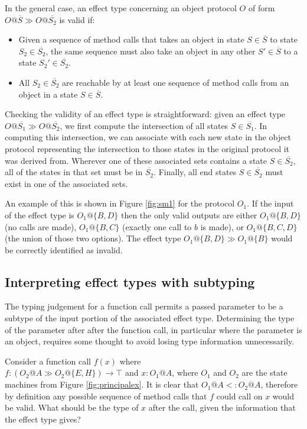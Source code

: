 \documentclass[preprint]{sigplanconf}
\newcommand{\figref}[1]{Figure \ref{#1}}
\begin{document}
In the general case, an effect type concerning an object protocol $O$
of form $O@\overline{S} \gg O@\overline{S_2}$ is
valid if:

\begin{itemize}
\item Given a sequence of method calls that takes an object in state $S \in \overline{S}$
to state $S_2 \in \overline{S_2}$, the same sequence must also take an object
in any other $S' \in \overline{S}$ to a state $S_2' \in \overline{S_2}$.
\item All $S_2 \in \overline{S_2}$ are reachable by at least one sequence
of method calls from an object in a state $S \in \overline{S}$.
\end{itemize}

Checking the validity of an effect type is straightforward: given an
effect type $O@\overline{S_1} \gg O@\overline{S_2}$, we first compute
the intersection of all states $S \in \overline{S_1}$. In computing this
intersection, we can associate with each new state in the object protocol
representing the intersection to those states in the original protocol it
was derived from. Wherever one of these associated sets contains a state
$S \in \overline{S_2}$, all of the states in that set must be in 
$\overline{S_2}$. Finally, all end states $S \in \overline{S_2}$ must
exist in one of the associated sets.

An example of this is shown in \figref{fig:sm1} for the protocol $O_1$.
If the input of the effect type is $O_1@\{B,D\}$ then the only valid
outputs are either $O_1@\{B,D\}$ (no calls are made),
$O_1@\{B,C\}$ (exactly one call to $b$ is made), or
$O_1@\{B,C,D\}$ (the union of those two options). The effect type
$O_1@\{B,D\} \gg O_1@\{B\}$ would be correctly identified as invalid.

\subsection{Interpreting effect types with subtyping}

The typing judgement for a function call permits a passed parameter to
be a subtype of the input portion of the associated effect type.
Determining the type of the parameter after after the
function call, in particular where the parameter is an object, 
requires some thought to avoid losing type information unnecessarily.

Consider a function call $f(x)$ where \\
$f : (O_2@A \gg O_2@\{E,H\}) \rightarrow \top$ and
$x : O_1@A$, where $O_1$ and $O_2$
are the state machines from \figref{fig:principalex}.
It is clear that $O_1@A <: O_2@A$, therefore by definition any possible
sequence of method calls that $f$ could call on $x$ would be valid.
What should be the type of $x$ after the call, given the information that
the effect type gives?
\end{document}
